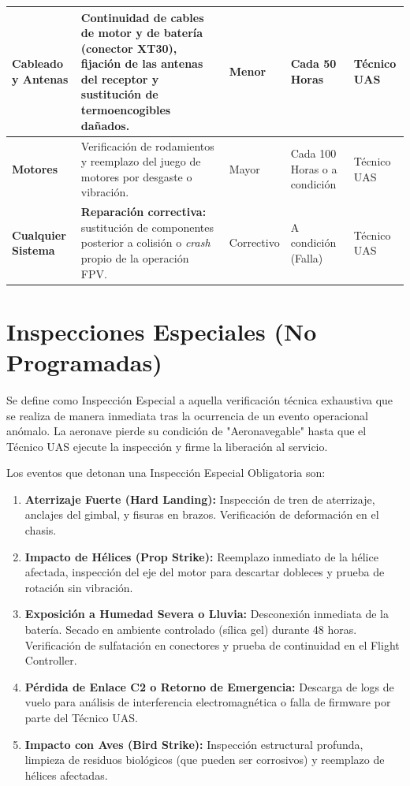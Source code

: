 \begin{longtable}{|p{}|p{}|m{}|p{}|p{}|}
\textbf{Cableado y Antenas} & Continuidad de cables de motor y de batería (conector XT30), fijación de las antenas del receptor y sustitución de termoencogibles dañados. & Menor & Cada 50 Horas & Técnico UAS \\ \hline
\textbf{Motores} & Verificación de rodamientos y reemplazo del juego de motores por desgaste o vibración. & Mayor & Cada 100 Horas o a condición & Técnico UAS \\ \hline
\textbf{Cualquier Sistema} & \textbf{Reparación correctiva:} sustitución de componentes posterior a colisión o \textit{crash} propio de la operación FPV. & Correctivo & A condición (Falla) & Técnico UAS \\ \hline
\end{longtable}

\section{Inspecciones Especiales (No Programadas)}

Se define como Inspección Especial a aquella verificación técnica exhaustiva que se realiza de manera inmediata tras la ocurrencia de un evento operacional anómalo. La aeronave pierde su condición de "Aeronavegable" hasta que el Técnico UAS ejecute la inspección y firme la liberación al servicio.

Los eventos que detonan una Inspección Especial Obligatoria son:

\begin{enumerate}
    \item \textbf{Aterrizaje Fuerte (Hard Landing):} Inspección de tren de aterrizaje, anclajes del gimbal, y fisuras en brazos. Verificación de deformación en el chasis.

    \item \textbf{Impacto de Hélices (Prop Strike):} Reemplazo inmediato de la hélice afectada, inspección del eje del motor para descartar dobleces y prueba de rotación sin vibración.

    \item \textbf{Exposición a Humedad Severa o Lluvia:} Desconexión inmediata de la batería. Secado en ambiente controlado (sílica gel) durante 48 horas. Verificación de sulfatación en conectores y prueba de continuidad en el Flight Controller.

    \item \textbf{Pérdida de Enlace C2 o Retorno de Emergencia:} Descarga de logs de vuelo para análisis de interferencia electromagnética o falla de firmware por parte del Técnico UAS.

    \item \textbf{Impacto con Aves (Bird Strike):} Inspección estructural profunda, limpieza de residuos biológicos (que pueden ser corrosivos) y reemplazo de hélices afectadas.
\end{enumerate}

